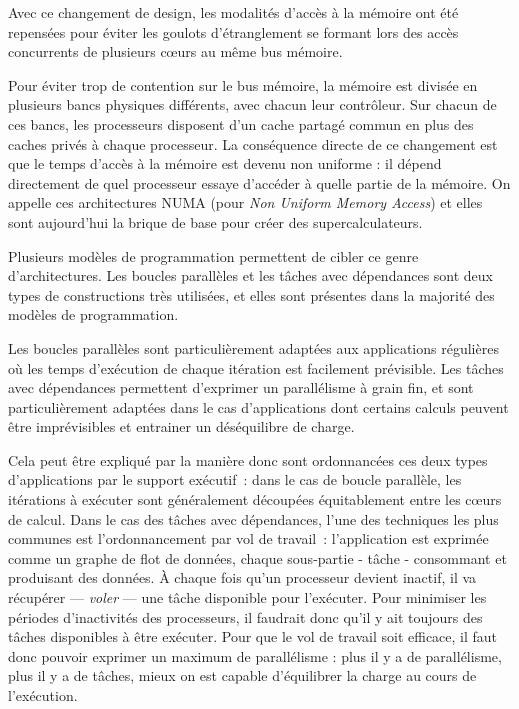 Avec ce changement de design, les modalités d'accès à la mémoire ont été repensées pour éviter les goulots d'étranglement se formant lors des accès concurrents de plusieurs cœurs au même bus mémoire.

Pour éviter trop de contention sur le bus mémoire, la mémoire est divisée en plusieurs bancs physiques différents, avec chacun leur contrôleur.
Sur chacun de ces bancs, les processeurs disposent d'un cache partagé commun en plus des caches privés à chaque processeur.
La conséquence directe de ce changement est que le temps d'accès à la mémoire est devenu non uniforme : il dépend directement de quel processeur essaye d'accéder à quelle partie de la mémoire.
On appelle ces architectures NUMA (pour \emph{Non Uniform Memory Access}) et elles sont aujourd'hui la brique de base pour créer des supercalculateurs.

Plusieurs modèles de programmation permettent de cibler ce genre d'architectures.
Les boucles parallèles et les tâches avec dépendances sont deux types de constructions très utilisées, et elles sont présentes dans la majorité des modèles de programmation.

Les boucles parallèles sont particulièrement adaptées aux applications régulières où les temps d'exécution de chaque itération est facilement prévisible.
Les tâches avec dépendances permettent d'exprimer un parallélisme à grain fin, et sont particulièrement adaptées dans le cas d'applications dont certains calculs peuvent être imprévisibles et entrainer un déséquilibre de charge.

Cela peut être expliqué par la manière donc sont ordonnancées ces deux types d'applications par le support exécutif~: dans le cas de boucle parallèle, les itérations à exécuter sont généralement découpées équitablement entre les cœurs de calcul.
Dans le cas des tâches avec dépendances, l'une des techniques les plus communes est l'ordonnancement par vol de travail~: l'application est exprimée comme un graphe de flot de données, chaque sous-partie - tâche - consommant et produisant des données. 
À chaque fois qu'un processeur devient inactif, il va récupérer --- \emph{voler} --- une tâche disponible pour l'exécuter.
Pour minimiser les périodes d'inactivités des processeurs, il faudrait donc qu'il y ait toujours des tâches disponibles à être exécuter.
Pour que le vol de travail soit efficace, il faut donc pouvoir exprimer un maximum de parallélisme : plus il y a de parallélisme, plus il y a de tâches, mieux on est capable d'équilibrer la charge au cours de l'exécution.

